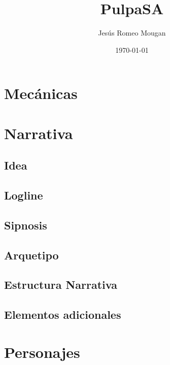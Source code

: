 \documentclass{report}  %
\title{PulpaSA}  %
\author{Jesús Romeo Mougan}                     %
\date{\today}                           %
\begin{document}


\renewcommand{\contentsname}{Índice}

\tableofcontents


\newpage

\section{Mecánicas}

\section{Narrativa}

\subsection{Idea}

\subsection{Logline}

\subsection{Sipnosis}

\subsection{Arquetipo}

\subsection{Estructura Narrativa}

\subsection{Elementos adicionales}

\section{Personajes}
\end{document}
